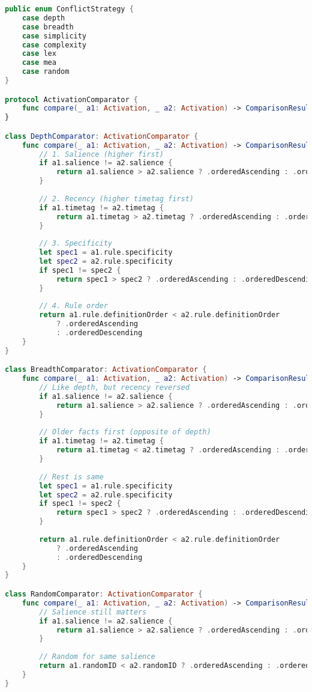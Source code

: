 \begin{lstlisting}[language=Swift]
public enum ConflictStrategy {
    case depth
    case breadth
    case simplicity
    case complexity
    case lex
    case mea
    case random
}

protocol ActivationComparator {
    func compare(_ a1: Activation, _ a2: Activation) -> ComparisonResult
}

class DepthComparator: ActivationComparator {
    func compare(_ a1: Activation, _ a2: Activation) -> ComparisonResult {
        // 1. Salience (higher first)
        if a1.salience != a2.salience {
            return a1.salience > a2.salience ? .orderedAscending : .orderedDescending
        }
        
        // 2. Recency (higher timetag first)
        if a1.timetag != a2.timetag {
            return a1.timetag > a2.timetag ? .orderedAscending : .orderedDescending
        }
        
        // 3. Specificity
        let spec1 = a1.rule.specificity
        let spec2 = a2.rule.specificity
        if spec1 != spec2 {
            return spec1 > spec2 ? .orderedAscending : .orderedDescending
        }
        
        // 4. Rule order
        return a1.rule.definitionOrder < a2.rule.definitionOrder 
            ? .orderedAscending 
            : .orderedDescending
    }
}

class BreadthComparator: ActivationComparator {
    func compare(_ a1: Activation, _ a2: Activation) -> ComparisonResult {
        // Like depth, but recency reversed
        if a1.salience != a2.salience {
            return a1.salience > a2.salience ? .orderedAscending : .orderedDescending
        }
        
        // Older facts first (opposite of depth)
        if a1.timetag != a2.timetag {
            return a1.timetag < a2.timetag ? .orderedAscending : .orderedDescending
        }
        
        // Rest is same
        let spec1 = a1.rule.specificity
        let spec2 = a2.rule.specificity
        if spec1 != spec2 {
            return spec1 > spec2 ? .orderedAscending : .orderedDescending
        }
        
        return a1.rule.definitionOrder < a2.rule.definitionOrder 
            ? .orderedAscending 
            : .orderedDescending
    }
}

class RandomComparator: ActivationComparator {
    func compare(_ a1: Activation, _ a2: Activation) -> ComparisonResult {
        // Salience still matters
        if a1.salience != a2.salience {
            return a1.salience > a2.salience ? .orderedAscending : .orderedDescending
        }
        
        // Random for same salience
        return a1.randomID < a2.randomID ? .orderedAscending : .orderedDescending
    }
}
\end{lstlisting}

